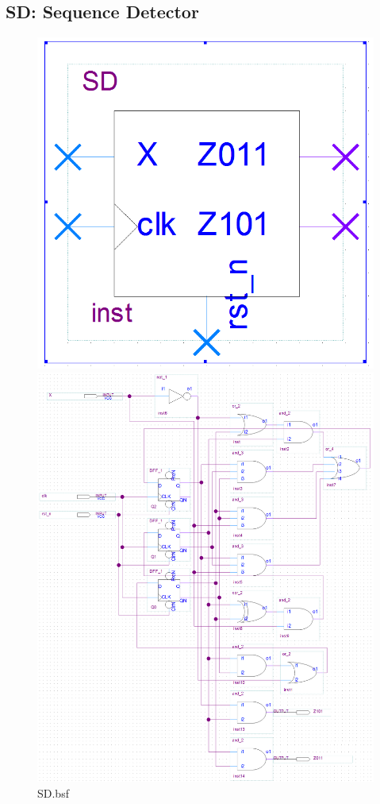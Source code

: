 \documentclass[12pt,a4paper]{article}
\begin{document}
  \subsection{SD: Sequence Detector}
  \begin{figure}[H]
    \centering
    \begin{subcaptionblock}{0.15\linewidth}
      \includegraphics[width=\linewidth]{Lab2_3/SD_bsf.png}
      \caption{SD.bsf}
    \end{subcaptionblock}
    \begin{subcaptionblock}{0.84\linewidth}
      \includegraphics[width=\linewidth]{Lab2_3/SD_bdf.png}

\end{subcaptionblock}
\end{figure}
\end{document}

